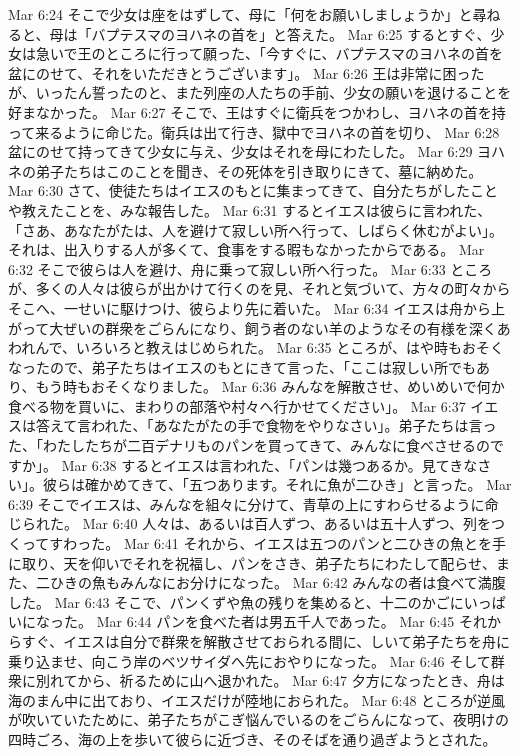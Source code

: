 Mar 6:24  そこで少女は座をはずして、母に「何をお願いしましょうか」と尋ねると、母は「バプテスマのヨハネの首を」と答えた。
Mar 6:25  するとすぐ、少女は急いで王のところに行って願った、「今すぐに、バプテスマのヨハネの首を盆にのせて、それをいただきとうございます」。
Mar 6:26  王は非常に困ったが、いったん誓ったのと、また列座の人たちの手前、少女の願いを退けることを好まなかった。
Mar 6:27  そこで、王はすぐに衛兵をつかわし、ヨハネの首を持って来るように命じた。衛兵は出て行き、獄中でヨハネの首を切り、
Mar 6:28  盆にのせて持ってきて少女に与え、少女はそれを母にわたした。
Mar 6:29  ヨハネの弟子たちはこのことを聞き、その死体を引き取りにきて、墓に納めた。
Mar 6:30  さて、使徒たちはイエスのもとに集まってきて、自分たちがしたことや教えたことを、みな報告した。
Mar 6:31  するとイエスは彼らに言われた、「さあ、あなたがたは、人を避けて寂しい所へ行って、しばらく休むがよい」。それは、出入りする人が多くて、食事をする暇もなかったからである。
Mar 6:32  そこで彼らは人を避け、舟に乗って寂しい所へ行った。
Mar 6:33  ところが、多くの人々は彼らが出かけて行くのを見、それと気づいて、方々の町々からそこへ、一せいに駆けつけ、彼らより先に着いた。
Mar 6:34  イエスは舟から上がって大ぜいの群衆をごらんになり、飼う者のない羊のようなその有様を深くあわれんで、いろいろと教えはじめられた。
Mar 6:35  ところが、はや時もおそくなったので、弟子たちはイエスのもとにきて言った、「ここは寂しい所でもあり、もう時もおそくなりました。
Mar 6:36  みんなを解散させ、めいめいで何か食べる物を買いに、まわりの部落や村々へ行かせてください」。
Mar 6:37  イエスは答えて言われた、「あなたがたの手で食物をやりなさい」。弟子たちは言った、「わたしたちが二百デナリものパンを買ってきて、みんなに食べさせるのですか」。
Mar 6:38  するとイエスは言われた、「パンは幾つあるか。見てきなさい」。彼らは確かめてきて、「五つあります。それに魚が二ひき」と言った。
Mar 6:39  そこでイエスは、みんなを組々に分けて、青草の上にすわらせるように命じられた。
Mar 6:40  人々は、あるいは百人ずつ、あるいは五十人ずつ、列をつくってすわった。
Mar 6:41  それから、イエスは五つのパンと二ひきの魚とを手に取り、天を仰いでそれを祝福し、パンをさき、弟子たちにわたして配らせ、また、二ひきの魚もみんなにお分けになった。
Mar 6:42  みんなの者は食べて満腹した。
Mar 6:43  そこで、パンくずや魚の残りを集めると、十二のかごにいっぱいになった。
Mar 6:44  パンを食べた者は男五千人であった。
Mar 6:45  それからすぐ、イエスは自分で群衆を解散させておられる間に、しいて弟子たちを舟に乗り込ませ、向こう岸のベツサイダへ先におやりになった。
Mar 6:46  そして群衆に別れてから、祈るために山へ退かれた。
Mar 6:47  夕方になったとき、舟は海のまん中に出ており、イエスだけが陸地におられた。
Mar 6:48  ところが逆風が吹いていたために、弟子たちがこぎ悩んでいるのをごらんになって、夜明けの四時ごろ、海の上を歩いて彼らに近づき、そのそばを通り過ぎようとされた。
